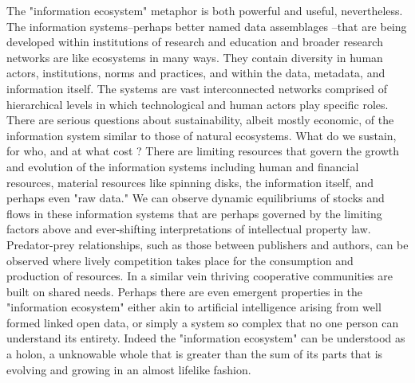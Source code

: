 The "information ecosystem" metaphor is both powerful and useful, nevertheless. The information systems--perhaps better named data assemblages \cite{kitchin_2014}--that are being developed within institutions of research and education and broader research networks are like ecosystems in many ways. They contain diversity in human actors, institutions, norms and practices, and within the data, metadata, and information itself. The systems are vast interconnected networks comprised of hierarchical levels in which technological and human actors play specific roles. There are serious questions about sustainability, albeit mostly economic, of the information system similar to those of natural ecosystems. What do we sustain, for who, and at what cost \cite[cf.][especially ch. 10)]{liverman_2004, kitchin_2014}? There are limiting resources that govern the growth and evolution of the information systems including human and financial resources, material resources like spinning disks, the information itself, and perhaps even "raw data." We can observe dynamic equilibriums of stocks and flows in these information systems that are perhaps governed by the limiting factors above and ever-shifting interpretations of intellectual property law. Predator-prey relationships, such as those between publishers and authors, can be observed where lively competition takes place for the consumption and production of resources. In a similar vein thriving cooperative communities are built on shared needs. Perhaps there are even emergent properties in the "information ecosystem" either akin to artificial intelligence arising from well formed linked open data, or simply a system so complex that no one person can understand its entirety. Indeed the "information ecosystem" can be understood as a holon, a unknowable whole that is greater than the sum of its parts that is evolving and growing in an almost lifelike fashion. 

